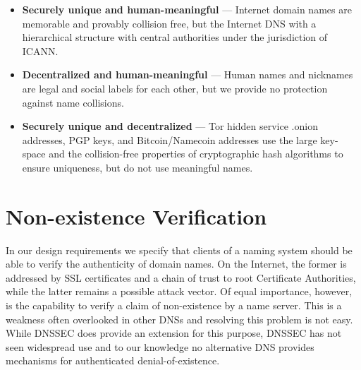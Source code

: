 \begin{itemize}
	\item \textbf{Securely unique and human-meaningful} --- Internet domain names are memorable and provably collision free, but the Internet DNS with a hierarchical structure with central authorities under the jurisdiction of ICANN.
	\item \textbf{Decentralized and human-meaningful} --- Human names and nicknames are legal and social labels for each other, but we provide no protection against name collisions.
	\item \textbf{Securely unique and decentralized} --- Tor hidden service .onion addresses, PGP keys, and Bitcoin/Namecoin addresses use the large key-space and the collision-free properties of cryptographic hash algorithms to ensure uniqueness, but do not use meaningful names.
\end{itemize}

\section{Non-existence Verification}

In our design requirements we specify that clients of a naming system should be able to verify the authenticity of domain names. On the Internet, the former is addressed by SSL certificates and a chain of trust to root Certificate Authorities, while the latter remains a possible attack vector. Of equal importance, however, is the capability to verify a claim of non-existence by a name server. This is a weakness often overlooked in other DNSs and resolving this problem is not easy. While DNSSEC does provide an extension for this purpose, DNSSEC has not seen widespread use and to our knowledge no alternative DNS provides mechanisms for authenticated denial-of-existence.
